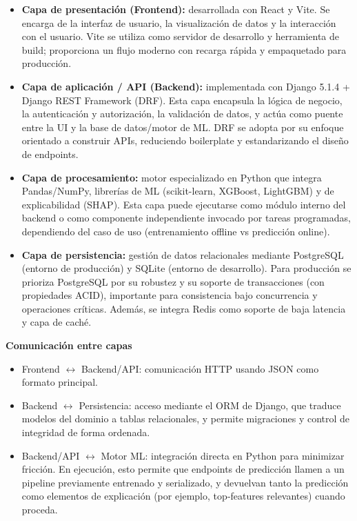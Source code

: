 \begin{itemize}
\item \textbf{Capa de presentación (Frontend):} desarrollada con React y Vite. Se 
encarga de la interfaz de usuario, la visualización de datos y la interacción con 
el usuario. Vite se utiliza como servidor de desarrollo y herramienta de build; 
proporciona un flujo moderno con recarga rápida y empaquetado para producción.

\item \textbf{Capa de aplicación / API (Backend):} implementada con Django 5.1.4 + 
Django REST Framework (DRF). Esta capa encapsula la lógica de negocio, la 
autenticación y autorización, la validación de datos, y actúa como puente entre 
la UI y la base de datos/motor de ML. DRF se adopta por su enfoque orientado a 
construir APIs, reduciendo boilerplate y estandarizando el diseño de endpoints.

\item \textbf{Capa de procesamiento:} motor especializado en Python que integra 
Pandas/NumPy, librerías de ML (scikit-learn, XGBoost, LightGBM) y de explicabilidad 
(SHAP). Esta capa puede ejecutarse como módulo interno del backend o como 
componente independiente invocado por tareas programadas, dependiendo del caso de 
uso (entrenamiento offline vs predicción online).

\item \textbf{Capa de persistencia:} gestión de datos relacionales mediante 
PostgreSQL (entorno de producción) y SQLite (entorno de desarrollo). Para 
producción se prioriza PostgreSQL por su robustez y su soporte de transacciones 
(con propiedades ACID), importante para consistencia bajo concurrencia y operaciones 
críticas. Además, se integra Redis como soporte de baja latencia y capa de caché.
\end{itemize}

\textbf{Comunicación entre capas}

\begin{itemize}
\item Frontend $\leftrightarrow$ Backend/API: comunicación HTTP usando JSON como 
formato principal.

\item Backend $\leftrightarrow$ Persistencia: acceso mediante el ORM de Django, que 
traduce modelos del dominio a tablas relacionales, y permite migraciones y control 
de integridad de forma ordenada.

\item Backend/API $\leftrightarrow$ Motor ML: integración directa en Python para 
minimizar fricción. En ejecución, esto permite que endpoints de predicción llamen 
a un pipeline previamente entrenado y serializado, y devuelvan tanto la predicción 
como elementos de explicación (por ejemplo, top‑features relevantes) cuando proceda.
\end{itemize}

